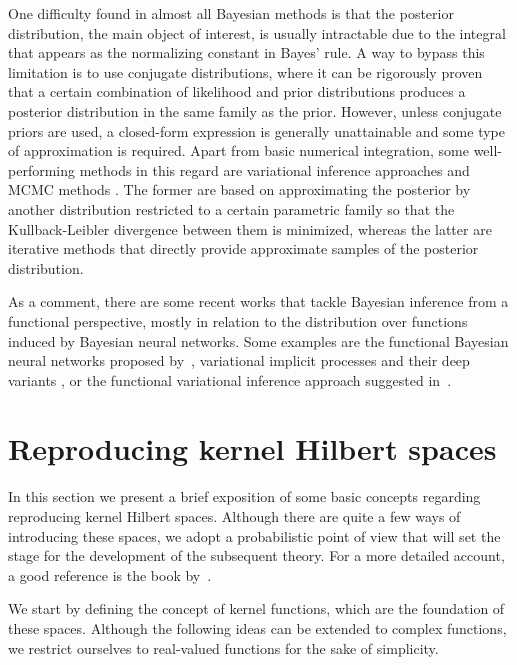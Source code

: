 One difficulty found in almost all Bayesian methods is that the posterior distribution, the main object of interest, is usually intractable due to the integral that appears as the normalizing constant in Bayes' rule. A way to bypass this limitation is to use conjugate distributions, where it can be rigorously proven that a certain combination of likelihood and prior distributions produces a posterior distribution in the same family as the prior. However, unless conjugate priors are used, a closed-form expression is generally unattainable and some type of approximation is required. Apart from basic numerical integration, some well-performing methods in this regard are variational inference approaches \citep[e.g.][]{blei2017variational} and MCMC methods \citep[e.g.][]{brooks2011handbook}. The former are based on approximating the posterior by another distribution restricted to a certain parametric family so that the Kullback-Leibler divergence between them is minimized, whereas the latter are iterative methods that directly provide approximate samples of the posterior distribution.

As a comment, there are some recent works that tackle Bayesian inference from a functional perspective, mostly in relation to the distribution over functions induced by Bayesian neural networks. Some examples are the functional Bayesian neural networks proposed by~\citet{sun2019functional}, variational implicit processes \citep{ma2019variational} and their deep variants \citep{ortega2022deep}, or the functional variational inference approach suggested in~\citet{ma2021functional}.

\section{Reproducing kernel Hilbert spaces}\label{sec:rkhs}

In this section we present a brief exposition of some basic concepts regarding reproducing kernel Hilbert spaces. Although there are quite a few ways of introducing these spaces, we adopt a probabilistic point of view that will set the stage for the development of the subsequent theory. For a more detailed account, a good reference is the book by~\citet{berlinet2004reproducing}.

We start by defining the concept of kernel functions, which are the foundation of these spaces. Although the following ideas can be extended to complex functions, we restrict ourselves to real-valued functions for the sake of simplicity.

